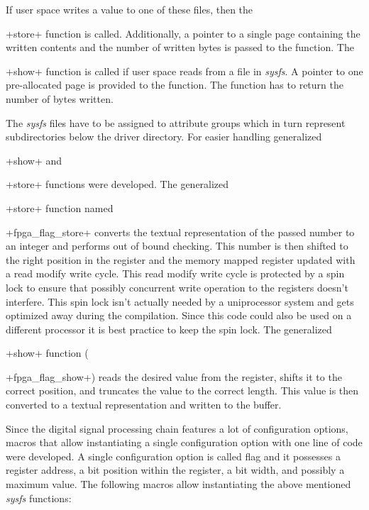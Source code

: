 \documentclass[12pt,a4paper,parskip=full,abstract=true,BCOR=12mm]{scrreprt}
\newcommand*{\SavedLstInline}{}
\DeclareRobustCommand*{\lstinline}{%
  \ifmmode
    \let\SavedBGroup\bgroup
    \def\bgroup{%
      \let\bgroup\SavedBGroup
      \hbox\bgroup
    }%
  \fi
  \SavedLstInline
}
\newcommand*{\lstitem}[1]{
  \setbox0\hbox{\lstinline{#1}}
  \item[\usebox0]
  \hfill \\
}
\def\device#1{\mbox{\textit{#1}}}
\begin{document}
If user space writes a value to one of these files, then the \lstinline+store+
function is called. Additionally, a pointer to a single page containing the written
contents and the number of written bytes is passed to the function. The
\lstinline+show+ function is called if user space reads from a file in \device{sysfs}.
A pointer to one pre-allocated page is provided to the function. The function
has to return the number of bytes written.

The \device{sysfs} files have to be assigned to attribute groups which in turn represent
subdirectories below the driver directory\cite{sysfs}. For easier handling
generalized \lstinline+show+ and \lstinline+store+ functions were developed. The generalized
\lstinline+store+ function named \lstinline+fpga_flag_store+ converts the textual representation
of the passed number to an integer and performs out of bound checking. This number is then
shifted to the right position in the register and the memory mapped register updated with
a read modify write cycle. This read modify write cycle is protected by a spin lock to
ensure that possibly concurrent write operation to the registers doesn't interfere. This
spin lock isn't actually needed by a uniprocessor system and gets optimized away during
the compilation. Since this code could also be used on a different processor it is best
practice to keep the spin lock. The generalized \lstinline+show+ function
(\lstinline+fpga_flag_show+) reads the desired value from the register, shifts it to the
correct position, and truncates the value to the correct length. This value is then
converted to a textual representation and written to the buffer.

Since the digital signal processing chain features a lot of configuration options,
macros that allow instantiating a single configuration option with one line of code
were developed. A single configuration option is called flag and it possesses a
register address, a bit position within the register, a bit width, and possibly a
maximum value. The following macros allow instantiating the above mentioned
\device{sysfs} functions:
\end{document}
